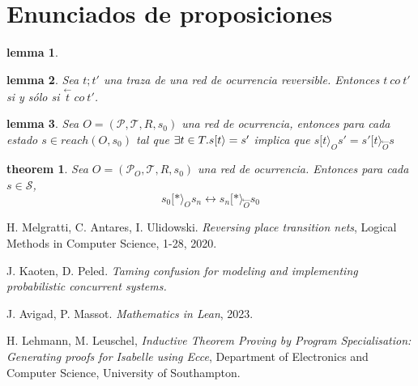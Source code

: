 \documentclass{article}
\newtheorem{teo}{theorem}
\newtheorem{lem}{lemma}
\newcommand{\Tr}{\mathcal{T}}
\newcommand{\Pl}{\mathcal{P}}
\newcommand{\St}{\mathcal{S}}
\newcommand{\rev}[1]{\overset{\leftarrow}{#1}}
\begin{document}
\section{Enunciados de proposiciones}

\begin{lem}
\end{lem}

\begin{lem}
Sea $t;t'$ una traza de una red de ocurrencia reversible. Entonces $t \ co \ t'$ si y sólo si $\rev{t} \ co \ t'$.
\end{lem}

\begin{lem}
Sea $O=(\Pl,\Tr,R,s_0)$ una red de ocurrencia, entonces para cada estado $s\in reach(O,s_0)$ tal que $\exists t\in \mathcal \Tr.s[t\rangle =s'$ implica que $s[t\rangle_O s' = s'[t\rangle_{\rev{O}} s$
\end{lem}

\begin{teo}
Sea $O=(\Pl_O,\Tr,R,s_0)$ una red de ocurrencia. Entonces para cada $s\in\St$,
$$s_0[*\rangle_O s_n \longleftrightarrow s_n[*\rangle_{\rev{O}} s_0$$
\end{teo}




\begin{thebibliography}{9}

  H. Melgratti, C. Antares, I. Ulidowski.
  \textit{Reversing place transition nets},
  Logical Methods in Computer Science,
  1-28,
  2020.

 J. Kaoten, D. Peled.
  \textit{Taming confusion for modeling and implementing probabilistic concurrent systems.}

J. Avigad, P. Massot.
 \textit{Mathematics in Lean},
 2023.

H. Lehmann, M. Leuschel,
\textit{Inductive Theorem Proving by Program Specialisation:
Generating proofs for Isabelle using Ecce},
Department of Electronics and Computer Science,
University of Southampton.

\end{thebibliography}
\end{document}
